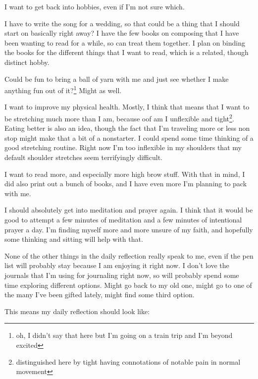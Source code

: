 \documentclass[12pt]{article}
\renewcommand{\,}{\textsuperscript{,}}
\begin{document}
I want to get back into hobbies, even if I'm not sure which.

I have to write the song for a wedding, so that could be a thing that I should start on basically right away?  
I have the few books on composing that I have been wanting to read for a while, so can treat them together.  
I plan on binding the books for the different things that I want to read, which is a related, though distinct hobby.

Could be fun to bring a ball of yarn with me and just see whether I make anything fun out of it?\footnote{oh, I didn't say that here but I'm going on a train trip and I'm beyond excited}  
Might as well.

I want to improve my physical health.  
Mostly, I think that means that I want to be stretching much more than I am, because oof am I unflexible and tight\footnote{distinguished here by tight having connotations of notable pain in normal movement}.  
Eating better is also an idea, though the fact that I'm traveling more or less non stop might make that a bit of a nonstarter.  
I could spend some time thinking of a good stretching routine.  
Right now I'm too inflexible in my shoulders that my default shoulder stretches seem terrifyingly difficult.

I want to read more, and especially more high brow stuff.  
With that in mind, I did also print out a bunch of books, and I have even more I'm planning to pack with me.

I should absolutely get into meditation and prayer again.  
I think that it would be good to attempt a few minutes of meditation and a few minutes of intentional prayer a day.  
I'm finding myself more and more unsure of my faith, and hopefully some thinking and sitting will help with that.

None of the other things in the daily reflection really speak to me, even if the pen list will probably stay because I am enjoying it right now.  
I don't love the journals that I'm using for journaling right now, so will probably spend some time exploring different options.  
Might go back to my old one, might go to one of the many I've been gifted lately, might find some third option.

This means my daily reflection should look like:
\end{document}
